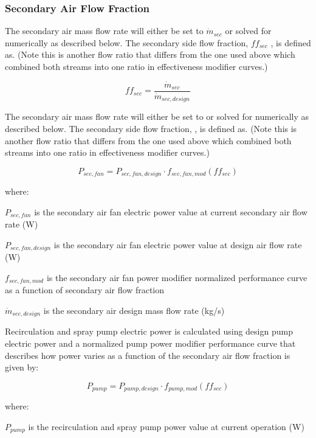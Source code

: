 \subsubsection{Secondary Air Flow Fraction}\label{secondary-air-flow-fraction}

The secondary air mass flow rate will either be set to \(\dot{m}_{sec}\) or solved for numerically as described below. The secondary side flow fraction, \(ff_{sec}\) , is defined as. (Note this is another flow ratio that differs from the one used above which combined both streams into one ratio in effectiveness modifier curves.)

\begin{equation}
ff_{sec} = \frac{\dot{m}_{sec}}{\dot{m}_{sec,design}}
\end{equation}

The secondary air mass flow rate will either be set to or solved for numerically as described below. The secondary side flow fraction, , is defined as. (Note this is another flow ratio that differs from the one used above which combined both streams into one ratio in effectiveness modifier curves.)

\begin{equation}
P_{sec,fan} = P_{sec,fan,design}\cdot f_{sec,fan,mod}\left(ff_{sec}\right)
\end{equation}

where:

\(P_{sec,fan}\) is the secondary air fan electric power value at current secondary air flow rate (W)

\(P_{sec,fan,design}\) is the secondary air fan electric power value at design air flow rate (W)

\(f_{sec,fan,mod}\) is the secondary air fan power modifier normalized performance curve as a function of secondary air flow fraction

\(\dot{m}_{sec,design}\) is the secondary air design mass flow rate (kg/s)

Recirculation and spray pump electric power is calculated using design pump electric power and a normalized pump power modifier performance curve that describes how power varies as a function of the secondary air flow fraction is given by:

\begin{equation}
P_{pump} = P_{pump,design}\cdot f_{pump,mod}\left(ff_{sec}\right)
\end{equation}

where:

\(P_{pump}\) is the recirculation and spray pump power value at current operation (W)

